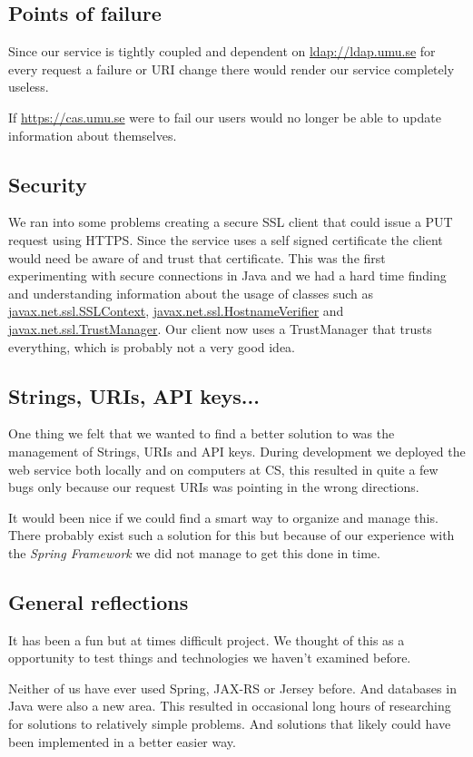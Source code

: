 \documentclass[titlepage, twocolumn, a4paper, 10pt]{article}
\begin{document}
\subsection{Points of failure}
Since our service is tightly coupled and dependent on
\url{ldap://ldap.umu.se} for every request a failure or URI change
there would render our service completely useless.

If \url{https://cas.umu.se} were to fail our users would no longer be
able to update information about themselves.

\subsection{Security}\label{sec:security}
We ran into some problems creating a secure SSL client that could
issue a PUT request using HTTPS. Since the service uses a self signed
certificate the client would need be aware of and trust that
certificate. This was the first experimenting with secure connections
in Java and we had a hard time finding and understanding information
about the usage of classes such as \url{javax.net.ssl.SSLContext},
\url{javax.net.ssl.HostnameVerifier} and
\url{javax.net.ssl.TrustManager}. Our client now uses a TrustManager
that trusts everything, which is probably not a very good idea.

\subsection{Strings, URIs, API keys...}
One thing we felt that we wanted to find a better solution
to was the management of Strings, URIs and API keys.
During development we deployed the web service both
locally and on computers at CS, this resulted in quite a
few bugs only because our request URIs was pointing
in the wrong directions.

It would been nice if we could find a smart way to organize and manage
this. There probably exist such a solution for this but because of our
experience with the \textit{Spring Framework} we did not manage to get
this done in time.

\subsection{General reflections}\label{sec:reflections}
It has been a fun but at times difficult project. We thought of this
as a opportunity to test things and technologies we haven't examined
before.

Neither of us have ever used Spring, JAX-RS or Jersey before. And
databases in Java were also a new area. This resulted in occasional
long hours of researching for solutions to relatively simple problems.
And solutions that likely could have been implemented in a better
easier way.
\end{document}
